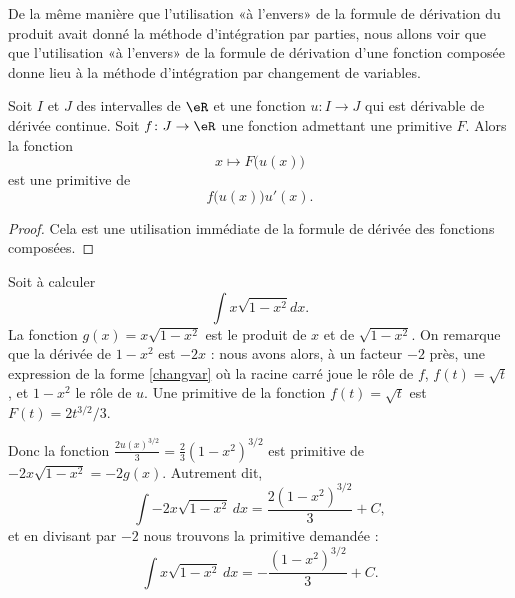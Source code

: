 De la même manière que l'utilisation «à l'envers» de la formule de dérivation du produit avait donné la méthode d'intégration par parties, nous allons voir que que l'utilisation «à l'envers» de la formule de dérivation d'une fonction composée donne lieu à la méthode d'intégration par changement de variables.
\begin{proposition}
    Soit \( I\) et \( J\) des intervalles de \( \eR\) et une fonction \( u\colon I\to J\) qui est dérivable de dérivée continue. Soit \( f\colon J\to \eR\) une fonction admettant une primitive \( F\). Alors la fonction
    \begin{equation}
        x\mapsto F\big( u(x) \big)
    \end{equation}
    est une primitive de
    \begin{equation}\label{changvar}
        f\big( u(x) \big)u'(x).
    \end{equation}
\end{proposition}

\begin{proof}
    Cela est une utilisation immédiate de la formule de dérivée des fonctions composées.
\end{proof}

\begin{example}
    Soit à calculer
    \begin{equation}
        \int x\sqrt{1-x^2}dx.
    \end{equation}
La fonction $g(x) = x\sqrt{1-x^2}$ est le produit de $x$ et de $\sqrt{1-x^2}$. On remarque que la dérivée de $1-x^2$ est $-2x$ : nous avons alors, à un facteur $-2$ près, une expression de la forme \eqref{changvar} où la racine carré joue le r\^ole de $f$, \( f(t)=\sqrt{t}\),   et $1-x^2$ le r\^ole de $u$.  Une primitive de la fonction \( f(t)=\sqrt{t}\) est $F(t) = 2t^{3/2}/3$. 
    
    Donc la fonction
      $  \frac{ 2u(x)^{3/2} }{ 3 }=\frac{ 2 }{ 3 }(1-x^2)^{3/2}$
    est primitive de
     $   -2x\sqrt{1-x^2} = -2 g(x)$.
    Autrement dit,
    \begin{equation}
        \int -2x\sqrt{1-x^2}\,dx=\frac{ 2 (1-x^2)^{3/2}}{ 3 } + C,
    \end{equation}
    et en divisant par \( -2\) nous trouvons la primitive demandée :
    \begin{equation}
        \int x\sqrt{1-x^2}\,dx=-\frac{ (1-x^2)^{3/2} }{ 3 } + C.
    \end{equation}
\end{example}

